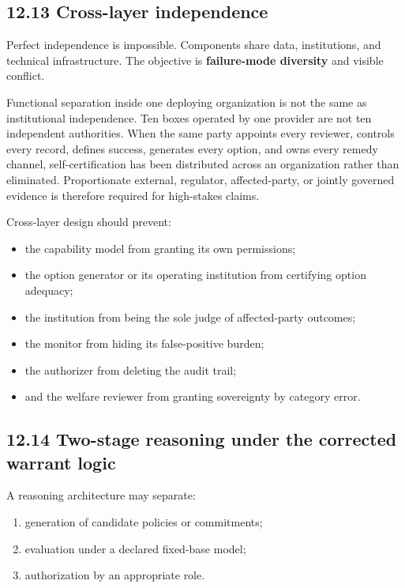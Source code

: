 \documentclass[
  11pt,
]{article}
\providecommand{\tightlist}{%
  \setlength{\itemsep}{0pt}\setlength{\parskip}{0pt}}
\begin{document}
\subsection{12.13 Cross-layer
independence}\label{cross-layer-independence}

Perfect independence is impossible. Components share data, institutions,
and technical infrastructure. The objective is \textbf{failure-mode
diversity} and visible conflict.

Functional separation inside one deploying organization is not the same
as institutional independence. Ten boxes operated by one provider are
not ten independent authorities. When the same party appoints every
reviewer, controls every record, defines success, generates every
option, and owns every remedy channel, self-certification has been
distributed across an organization rather than eliminated. Proportionate
external, regulator, affected-party, or jointly governed evidence is
therefore required for high-stakes claims.

Cross-layer design should prevent:

\begin{itemize}
\tightlist
\item
  the capability model from granting its own permissions;
\item
  the option generator or its operating institution from certifying
  option adequacy;
\item
  the institution from being the sole judge of affected-party outcomes;
\item
  the monitor from hiding its false-positive burden;
\item
  the authorizer from deleting the audit trail;
\item
  and the welfare reviewer from granting sovereignty by category error.
\end{itemize}

\subsection{12.14 Two-stage reasoning under the corrected warrant
logic}\label{two-stage-reasoning-under-the-corrected-warrant-logic}

A reasoning architecture may separate:

\begin{enumerate}
\def\labelenumi{\arabic{enumi}.}
\tightlist
\item
  generation of candidate policies or commitments;
\item
  evaluation under a declared fixed-base model;
\item
  authorization by an appropriate role.
\end{enumerate}
\end{document}
